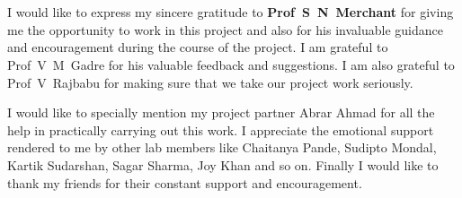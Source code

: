 \chapter*{}
I would like to express my sincere gratitude to \textbf{Prof~S~N~Merchant}
for giving me the opportunity to work in this project and also for his
invaluable guidance and encouragement during the course of the project. I am
grateful to Prof~V~M~Gadre for his valuable feedback and suggestions. I am
also grateful to Prof~V~Rajbabu for making sure that we take our project work
seriously. 

I would like to specially mention my project partner Abrar Ahmad 
for all the help in practically carrying out this work. I appreciate the 
emotional support rendered to me by other lab members like Chaitanya Pande, 
Sudipto Mondal, Kartik Sudarshan, Sagar Sharma, Joy Khan and so on. Finally
I would like to thank my friends for their constant support and encouragement.